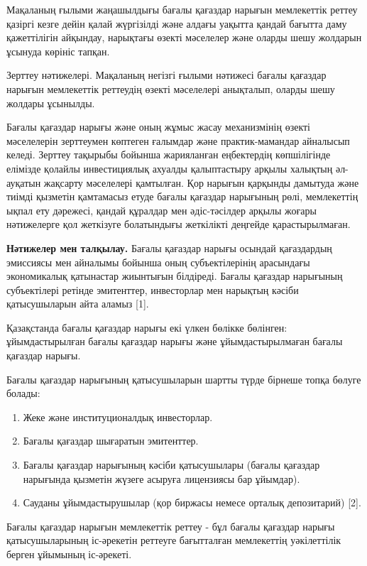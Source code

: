 \begin{multicols}{2}
Мақаланың ғылыми жаңашылдығы бағалы қағаздар нарығын мемлекеттік реттеу
қазіргі кезге дейін қалай жүргізілді және алдағы уақытта қандай бағытта
даму қажеттілігін айқындау, нарықтағы өзекті мәселелер және оларды шешу
жолдарын ұсынуда көрініс тапқан.

Зерттеу нәтижелері. Мақаланың негізгі ғылыми нәтижесі бағалы қағаздар
нарығын мемлекеттік реттеудің өзекті мәселелері анықталып, оларды шешу
жолдары ұсынылды.

Бағалы қағаздар нарығы және оның жұмыс жасау механизмінің өзекті
мәселелерін зерттеумен көптеген ғалымдар және практик-мамандар айналысып
келеді. Зерттеу тақырыбы бойынша жарияланған еңбектердің көпшілігінде
елімізде қолайлы инвестициялық ахуалды қалыптастыру арқылы халықтың
әл-ауқатын жақсарту мәселелері қамтылған. Қор нарығын қарқынды дамытуда
және тиімді қызметін қамтамасыз етуде бағалы қағаздар нарығының рөлі,
мемлекеттің ықпал ету дәрежесі, қандай құралдар мен әдіс-тәсілдер арқылы
жоғары нәтижелерге қол жеткізуге болатындығы жеткілікті деңгейде
қарастырылмаған.

{\bfseries Нәтижелер мен талқылау.} Бағалы қағаздар нарығы осындай
қағаздардың эмиссиясы мен айналымы бойынша оның субъектілерінің
арасындағы экономикалық қатынастар жиынтығын білдіреді. Бағалы қағаздар
нарығының субъектілері ретінде эмитенттер, инвесторлар мен нарықтың
кәсіби қатысушыларын айта аламыз {[}1{]}.

Қазақстанда бағалы қағаздар нарығы екі үлкен бөлікке бөлінген:
ұйымдастырылған бағалы қағаздар нарығы және ұйымдастырылмаған бағалы
қағаздар нарығы.

Бағалы қағаздар нарығының қатысушыларын шартты түрде бірнеше топқа
бөлуге болады:

\begin{enumerate}
\def\labelenumi{\arabic{enumi}.}
\item
  Жеке және институционалдық инвесторлар.
\item
  Бағалы қағаздар шығаратын эмитенттер.
\item
  Бағалы қағаздар нарығының кәсіби қатысушылары (бағалы қағаздар
  нарығында қызметін жүзеге асыруға лицензиясы бар ұйымдар).
\item
  Сауданы ұйымдастырушылар (қор биржасы немесе орталық депозитарий)
  {[}2{]}.
\end{enumerate}

Бағалы қағаздар нарығын мемлекеттік реттеу - бұл бағалы қағаздар нарығы
қатысушыларының іс-әрекетін реттеуге бағытталған мемлекеттің
уәкілеттілік берген ұйымының іс-әрекеті.


\end{multicols}
